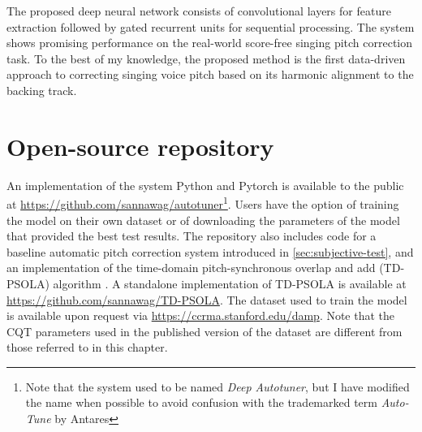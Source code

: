 The proposed deep neural network consists of convolutional layers for feature extraction followed by gated recurrent units for sequential processing. The system shows promising performance on the real-world score-free singing pitch correction task. To the best of my knowledge, the proposed method is the first data-driven approach to correcting singing voice pitch based on its harmonic alignment to the backing track.

\section{Open-source repository}
An implementation of the system Python and Pytorch is available to the public at \url{https://github.com/sannawag/autotuner}\footnote{Note that the system used to be named \textit{Deep Autotuner}, but I have modified the name when possible to avoid confusion with the trademarked term \textit{Auto-Tune} by Antares}. Users have the option of training the model on their own dataset or of downloading the parameters of the model that provided the best test results. The repository also includes code for a baseline automatic pitch correction system introduced in \ref{sec:subjective-test}, and an implementation of the time-domain pitch-synchronous overlap and add (TD-PSOLA) algorithm \cite{charpentier1986diphone}. A standalone implementation of TD-PSOLA is available at \url{https://github.com/sannawag/TD-PSOLA}. The dataset used to train the model is available upon request via \url{https://ccrma.stanford.edu/damp}. Note that the CQT parameters used in the published version of the dataset are different from those referred to in this chapter.

